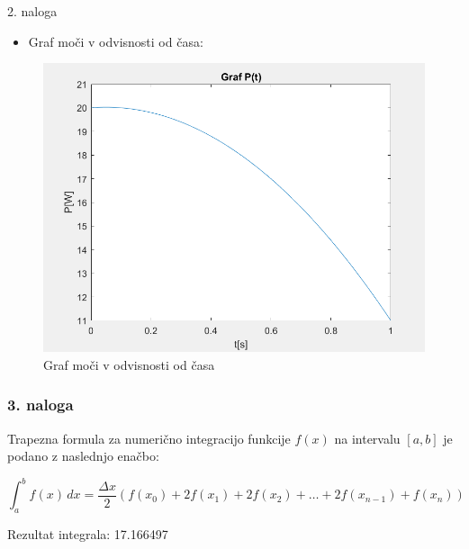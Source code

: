 \documentclass{beamer}
\begin{document}
\begin{frame}{2. naloga}

\begin{itemize}
    \item  Graf moči v odvisnosti od časa:
\end{itemize}  

\begin{figure}
    \centering
    \includegraphics[width=1\linewidth]{image.png}
    \caption{Graf moči v odvisnosti od časa}
    \label{fig:enter-label}
\end{figure}

\end{frame}

\begin{frame}
\frametitle{3. naloga}

Trapezna formula za numerično integracijo funkcije \( f(x) \) na intervalu \([a, b]\) je podano z naslednjo enačbo:

\[
\int_a^b f(x) \, dx = \frac{\Delta x}{2} \left( f(x_0) + 2f(x_1) + 2f(x_2) + \dots + 2f(x_{n-1}) + f(x_n) \right)
\]

Rezultat integrala: 17.166497

\end{frame}
\end{document}
